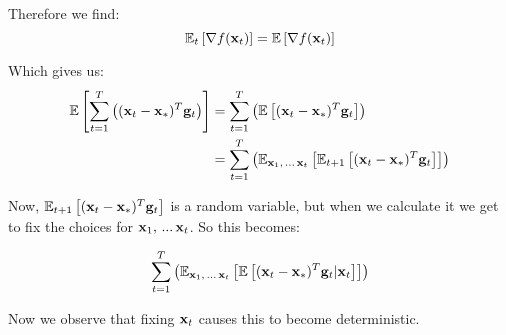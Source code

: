 \documentclass[11pt]{article}
\begin{document}
Therefore we find:
\[ \mathbb{E}_{t} \left[ \nabla f({\bf x}_{t}) \right] = \mathbb{E} \left[ \nabla f({\bf x}_{t}) \right] \]

Which gives us:
\begin{align*}
\mathbb{E} \left[ \sum_{t = 1}^{T} \left( ({\bf x}_{t} - {\bf x}_{\ast})^{T} {\bf g}_{t} \right) \right] &= \sum_{t = 1}^{T} \left(  \mathbb{E} \left[  ({\bf x}_{t} - {\bf x}_{\ast})^{T} {\bf g}_{t} \right] \right) \\
&= \sum_{t = 1}^{T} \left(  \mathbb{E}_{{\bf x}_{1}, \,...\, {\bf x}_{t}} \left[ \mathbb{E}_{t + 1} \left[  ({\bf x}_{t} - {\bf x}_{\ast})^{T} {\bf g}_{t} \right] \right] \right) \\
\end{align*}

Now, $\mathbb{E}_{t + 1} \left[  ({\bf x}_{t} - {\bf x}_{\ast})^{T} {\bf g}_{t} \right]$ is a random variable, but when we calculate it we get to fix the choices for ${\bf x}_{1}, \,...\, {\bf x}_{t}$.  So this becomes:

\[ \sum_{t = 1}^{T} \left(  \mathbb{E}_{{\bf x}_{1}, \,...\, {\bf x}_{t}} \left[ \mathbb{E} \left[  ({\bf x}_{t} - {\bf x}_{\ast})^{T} {\bf g}_{t} | {\bf x}_{t} \right] \right] \right) \]

Now we observe that fixing ${\bf x}_{t}$ causes this to become deterministic.
\end{document}
